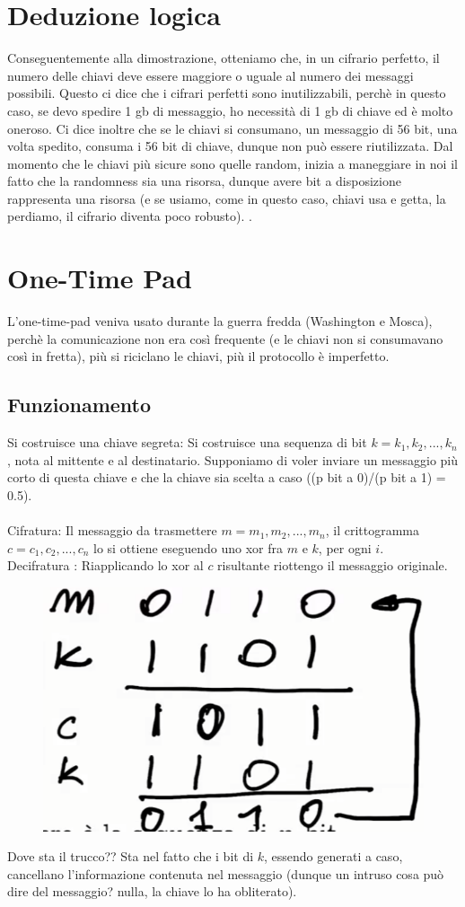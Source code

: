 \section{Deduzione logica}
Conseguentemente alla dimostrazione, otteniamo che, in un cifrario perfetto, il numero delle chiavi deve essere maggiore o uguale al numero dei messaggi possibili. Questo ci dice che i cifrari perfetti sono inutilizzabili, perchè in questo caso, se devo spedire 1 gb di messaggio, ho necessità di 1 gb di chiave ed è molto oneroso. Ci dice inoltre che se le chiavi si consumano, un messaggio di 56 bit, una volta spedito, consuma i 56 bit di chiave, dunque non può essere riutilizzata. Dal momento che le chiavi più sicure sono quelle random, inizia a maneggiare in noi il fatto che la randomness sia una risorsa, dunque avere bit a disposizione rappresenta una risorsa (e se usiamo, come in questo caso, chiavi usa e getta, la perdiamo, il cifrario diventa poco robusto). .

\section{One-Time Pad}
L'one-time-pad veniva usato durante la guerra fredda (Washington e Mosca), perchè la comunicazione non era così frequente (e le chiavi non si consumavano così in fretta), più si riciclano le chiavi, più il protocollo è imperfetto.
\subsection{Funzionamento}
Si costruisce una chiave segreta:
Si costruisce una sequenza di bit $k = k_1, k_2, ..., k_n$, nota al mittente e al destinatario. Supponiamo di voler inviare un messaggio più corto di questa chiave e che la chiave sia scelta a caso ((p bit a 0)/(p bit a 1) = 0.5).\\\\
Cifratura:
Il messaggio da trasmettere $m = m_1, m_2, ..., m_n$, il crittogramma $c = c_1, c_2, ..., c_n$ lo si ottiene eseguendo uno xor fra $m$ e $k$, per ogni $i$. \\Decifratura : Riapplicando lo xor al $c$ risultante riottengo il messaggio originale.

\begin{figure}[htp]
\includegraphics[width=0.8\linewidth]{./img/xor.png}
\label{img:xor}
\end{figure}
Dove sta il trucco?? Sta nel fatto che i bit di $k$, essendo generati a caso, cancellano l'informazione contenuta nel messaggio (dunque un intruso cosa può dire del messaggio? nulla, la chiave lo ha obliterato).

